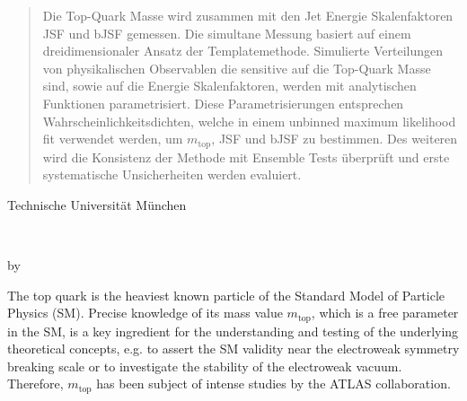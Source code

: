 \begin{abstract*}
\begin{abstract}
Die Top-Quark Masse wird zusammen mit den Jet Energie Skalenfaktoren JSF und bJSF gemessen. Die simultane Messung basiert auf einem  dreidimensionaler Ansatz  der Templatemethode. Simulierte Verteilungen von physikalischen Observablen die sensitive auf die Top-Quark Masse sind, sowie auf die Energie  Skalenfaktoren, werden mit analytischen Funktionen parametrisiert. Diese Parametrisierungen entsprechen Wahrscheinlichkeitsdichten, welche in einem unbinned maximum likelihood fit verwendet werden, um $m_{\textrm{top}}$, JSF und bJSF zu bestimmen. Des weiteren wird die Konsistenz der Methode mit Ensemble Tests überprüft und erste systematische Unsicherheiten werden evaluiert.
 \end{abstract}
\cleardoublepage


\vspace*{0.15\textheight}
\begin{abstract*}
	{ \centering
		{\fontsize{30}{35}\selectfont
	
			Technische Universität München}
		
		\vspace{0.2cm}
		
		\begin{singlespace}
		\Huge
			\InstituteName	
		\end{singlespace}
		\begin{singlespace}
		\fontsize{15}{10}\selectfont
	
			\Institute	
		\end{singlespace}
		\vspace{2.0cm}
		\begin{singlespace}
			{\Large
				\textbf{\thesistitle} \\
			}
		\end{singlespace}
		\vspace{0.5cm}
		\begin{singlespace}
			
			by\\
			\vspace{0.5cm}
			\thesisauthor
		\end{singlespace}
		\date{}
		
		\vspace{2.0cm}
	}
\begin{abstract*}
\noindent The top quark is the heaviest known particle of the Standard Model of Particle Physics (SM). Precise knowledge of its mass value $m_{\textrm{top}}$, which is a free parameter in the SM, is a key ingredient for the understanding and testing of the underlying theoretical concepts, e.g. to assert the SM validity near the electroweak symmetry breaking scale or to investigate the stability of the electroweak vacuum. Therefore, $m_{\textrm{top}}$ has been subject of intense studies by the ATLAS collaboration.


\end{abstract*}
\end{abstract*}
\end{abstract*}
